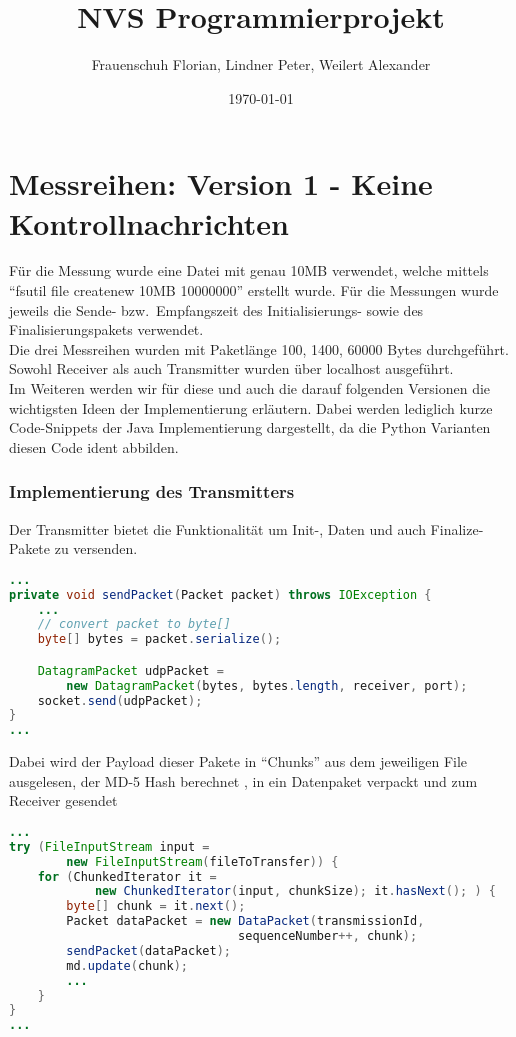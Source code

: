 \documentclass{article}
\title{NVS Programmierprojekt}
\author{Frauenschuh Florian, Lindner Peter, Weilert Alexander}
\date{\today}
\begin{document}
    \maketitle

    \section{Messreihen: Version 1 - Keine Kontrollnachrichten}
    Für die Messung wurde eine Datei mit genau 10MB verwendet, welche mittels \enquote{fsutil file createnew 10MB 10000000} erstellt wurde.
    Für die Messungen wurde jeweils die Sende- bzw.\ Empfangszeit des Initialisierungs- sowie des Finalisierungspakets verwendet. \\
    Die drei Messreihen wurden mit Paketlänge 100, 1400, 60000 Bytes durchgeführt. \\
    Sowohl Receiver als auch Transmitter wurden über localhost ausgeführt.\\

    Im Weiteren werden wir für diese und auch die darauf folgenden Versionen die wichtigsten Ideen der Implementierung
    erläutern.
    Dabei werden lediglich kurze Code-Snippets der Java Implementierung dargestellt, da die Python Varianten diesen
    Code ident abbilden.

    \subsubsection*{Implementierung des Transmitters}
    Der Transmitter bietet die Funktionalität um Init-, Daten und auch Finalize-Pakete zu versenden.\\

    \begin{lstlisting}[language=Java]
...
private void sendPacket(Packet packet) throws IOException {
    ...
    // convert packet to byte[]
    byte[] bytes = packet.serialize();

    DatagramPacket udpPacket =
        new DatagramPacket(bytes, bytes.length, receiver, port);
    socket.send(udpPacket);
}
...
    \end{lstlisting}

    Dabei wird der Payload dieser Pakete in \enquote{Chunks} aus dem jeweiligen File ausgelesen, der MD-5 Hash berechnet
    , in ein Datenpaket verpackt und zum Receiver gesendet

    \begin{lstlisting}[language=Java]
...
try (FileInputStream input =
        new FileInputStream(fileToTransfer)) {
    for (ChunkedIterator it =
            new ChunkedIterator(input, chunkSize); it.hasNext(); ) {
        byte[] chunk = it.next();
        Packet dataPacket = new DataPacket(transmissionId,
                                sequenceNumber++, chunk);
        sendPacket(dataPacket);
        md.update(chunk);
        ...
    }
}
...
    \end{lstlisting}
\end{document}
